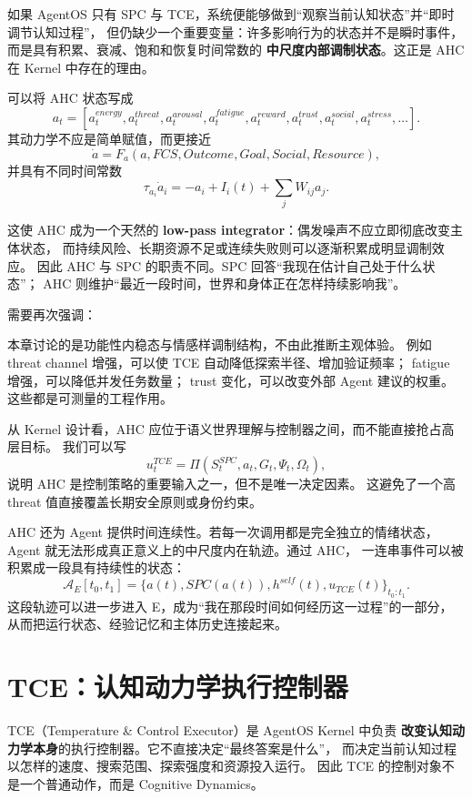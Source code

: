 如果 AgentOS 只有 SPC 与 TCE，系统便能够做到``观察当前认知状态''并``即时调节认知过程''，
但仍缺少一个重要变量：许多影响行为的状态并不是瞬时事件，而是具有积累、衰减、饱和和恢复时间常数的
\textbf{中尺度内部调制状态}。这正是 AHC 在 Kernel 中存在的理由。

可以将 AHC 状态写成
\[
a_t
=
[
a_t^{energy},
a_t^{threat},
a_t^{arousal},
a_t^{fatigue},
a_t^{reward},
a_t^{trust},
a_t^{social},
a_t^{stress},
\ldots
].
\]
其动力学不应是简单赋值，而更接近
\[
\dot a
=
F_a(a,
FCS,
Outcome,
Goal,
Social,
Resource),
\]
并具有不同时间常数
\[
\tau_{a_i}\dot a_i
=
-a_i
+
I_i(t)
+
\sum_j W_{ij}a_j.
\]

这使 AHC 成为一个天然的
\textbf{low-pass integrator}：偶发噪声不应立即彻底改变主体状态，
而持续风险、长期资源不足或连续失败则可以逐渐积累成明显调制效应。
因此 AHC 与 SPC 的职责不同。SPC 回答``我现在估计自己处于什么状态''；
AHC 则维护``最近一段时间，世界和身体正在怎样持续影响我''。

需要再次强调：
\begin{statementbox}
\centering
{}
\end{statementbox}
本章讨论的是功能性内稳态与情感样调制结构，不由此推断主观体验。
例如 threat channel 增强，可以使 TCE 自动降低探索半径、增加验证频率；
fatigue 增强，可以降低并发任务数量；
trust 变化，可以改变外部 Agent 建议的权重。
这些都是可测量的工程作用。

从 Kernel 设计看，AHC 应位于语义世界理解与控制器之间，而不能直接抢占高层目标。
我们可以写
\[
u_t^{TCE}
=
\Pi(
S_t^{SPC},
a_t,
G_t,
\Psi_t,
\Omega_t
),
\]
说明 AHC 是控制策略的重要输入之一，但不是唯一决定因素。
这避免了一个高 threat 值直接覆盖长期安全原则或身份约束。

AHC 还为 Agent 提供时间连续性。若每一次调用都是完全独立的情绪状态，
Agent 就无法形成真正意义上的中尺度内在轨迹。通过 AHC，
一连串事件可以被积累成一段具有持续性的状态：
\[
\mathcal A_E[t_0,t_1]
=
\{a(t),SPC(a(t)),h^{self}(t),u_{TCE}(t)\}_{t_0:t_1}.
\]
这段轨迹可以进一步进入 E，成为``我在那段时间如何经历这一过程''的一部分，
从而把运行状态、经验记忆和主体历史连接起来。


\section{TCE：认知动力学执行控制器}

TCE（Temperature \& Control Executor）是 AgentOS Kernel 中负责
\textbf{改变认知动力学本身}的执行控制器。它不直接决定``最终答案是什么''，
而决定当前认知过程以怎样的速度、搜索范围、探索强度和资源投入运行。
因此 TCE 的控制对象不是一个普通动作，而是 Cognitive Dynamics。

